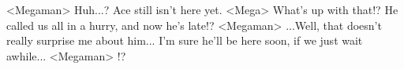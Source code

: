 <Megaman> Huh...? Ace still isn't here yet. 
<Mega> What's up with that!? 
He called us all in a hurry, and now he's late!? 
<Megaman> ...Well, that doesn't really surprise me about him... 
I'm sure he'll be here soon, if we just wait awhile... 
<Megaman> !? 
